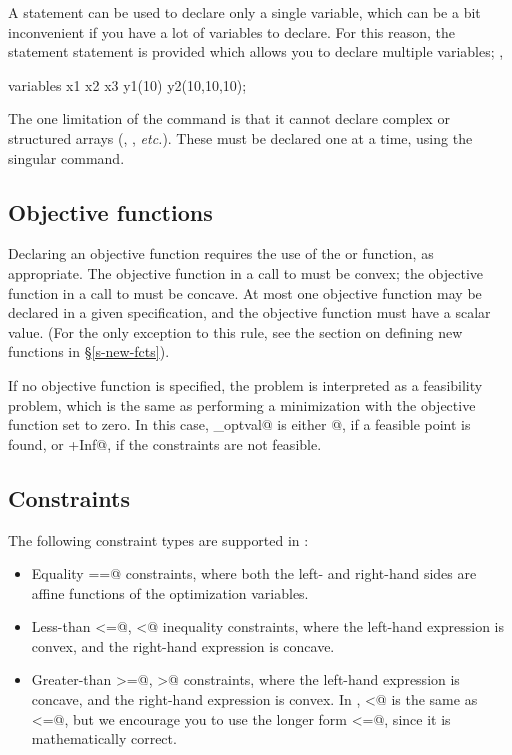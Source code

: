 \documentclass[12pt]{article}
\begin{document}
A \verb@variable@ statement can be used to declare only a single
variable, which can be a bit inconvenient if you have a lot of variables
to declare. For this reason, the statement \verb@variables@ statement
is provided which allows you to declare multiple variables; \ie,
\begin{code}
	variables x1 x2 x3 y1(10) y2(10,10,10);
\end{code}
The one limitation of the \verb@variables@ command is that it cannot
declare complex or structured arrays (\eg, \verb@symmetric@,
\emph{etc.}). These must be declared
one at a time, using the singular \verb@variable@ command.

\subsection{Objective functions}

Declaring an objective function requires
the use of the \verb@minimize@ or \verb@maximize@ function, as
appropriate.  The objective function in a call to \verb@minimize@ 
must be convex; the objective function in a call to \verb@maximize@
must be concave. At most one objective function may be declared in a 
given \cvx specification, and the objective function must have a
scalar value. (For the only exception to this rule, see the 
section on defining new functions in \S\ref{s-new-fcts}).

If no objective function is specified, the problem is interpreted
as a feasibility problem, which is the same as performing a minimization
with the objective function set to zero. In this case, \verb@cvx_optval@
is either @, if a feasible point is found, or
\verb@+Inf@, if the constraints are not feasible.

\subsection{Constraints}

The following constraint types are supported in \cvx:
\begin{itemize}
\item Equality \verb@==@ constraints, where both the left- and right-hand
sides are affine functions of the optimization variables.
\item Less-than \verb@<=@, \verb@<@ inequality constraints, where the left-hand
expression is convex, and the right-hand expression is concave.
\item Greater-than \verb@>=@, \verb@>@ constraints, where the left-hand
expression is concave, and the right-hand expression is convex.
In \cvx, \verb@<@ is the same as \verb@<=@, but we encourage you to
use the longer form \verb@<=@, since it is mathematically correct.
\end{itemize}
\end{document}
